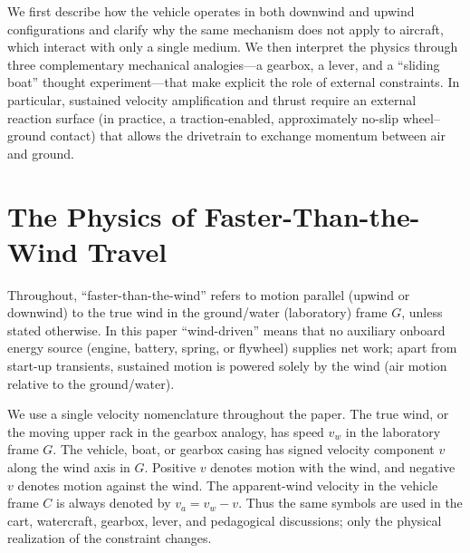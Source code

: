 \documentclass[reprint,aps,pra,longbibliography]{revtex4-2}
\begin{document}
We first describe how the vehicle operates in both downwind and upwind configurations and clarify why the same mechanism does not apply to aircraft, which interact with only a single medium. We then interpret the physics through three complementary mechanical analogies---a gearbox, a lever, and a ``sliding boat'' thought experiment---that make explicit the role of external constraints. In particular, sustained velocity amplification and thrust require an external reaction surface (in practice, a traction-enabled, approximately no-slip wheel--ground contact) that allows the drivetrain to exchange momentum between air and ground.

\section{The Physics of Faster-Than-the-Wind Travel}

Throughout, ``faster-than-the-wind'' refers to motion parallel (upwind or downwind) to the true wind in the ground/water (laboratory) frame \(G\), unless stated otherwise.
In this paper ``wind-driven'' means that no auxiliary onboard energy source
(engine, battery, spring, or flywheel) supplies net work; apart from start-up
transients, sustained motion is powered solely by the wind (air motion relative
to the ground/water).

We use a single velocity nomenclature throughout the paper. The true wind, or
the moving upper rack in the gearbox analogy, has speed \(v_w\) in the
laboratory frame \(G\).
The vehicle, boat, or gearbox casing has signed velocity component \(v\)
along the wind axis in \(G\). Positive \(v\) denotes motion with the wind,
and negative \(v\) denotes motion against the wind.
The apparent-wind velocity in the vehicle frame \(C\) is always denoted
by \(v_a=v_w-v\). Thus the same symbols are used in the cart, watercraft,
gearbox, lever, and pedagogical discussions; only the physical realization of
the constraint changes.
\end{document}
